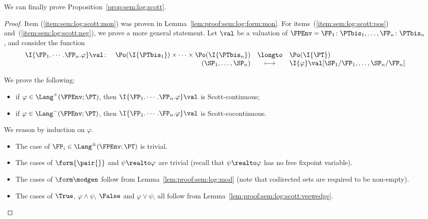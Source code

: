 We can finally prove Proposition~\ref{prop:sem:log:scott}.

\PropFormScott*

\begin{proof}
Item (\ref{item:sem:log:scott:mon})
was proven in Lemma~\ref{lem:proof:sem:log:form:mon}.
For items~(\ref{item:sem:log:scott:pos}) and~(\ref{item:sem:log:scott:neg}),
we prove a more general statement.
Let $\val$ be a valuation of
$\FPEnv = \FP_1\colon \PTbis_1, \dots, \FP_n\colon \PTbis_n$,
and consider the function
\[
\begin{array}{l r c l}
  \I{\FP_1.\cdots.\FP_n.\varphi}\val \colon
& \Po(\I{\PTbis_1}) \times \dots \times \Po(\I{\PTbis_n})
& \longto
& \Po(\I{\PT})
\\
%
& (\SP_1,\dots,\SP_n)
& \longmapsto
& \I{\varphi}\val[\SP_1 / \FP_1, \dots, \SP_n / \FP_n]
\end{array}
\]

\noindent
We prove the following:
\begin{itemize}
\item
if $\varphi \in \Lang^+(\FPEnv;\PT)$,
then 
$\I{\FP_1.\cdots.\FP_n.\varphi}\val$
is Scott-continuous;

\item
if $\varphi \in \Lang^-(\FPEnv;\PT)$,
then 
$\I{\FP_1.\cdots.\FP_n.\varphi}\val$
is Scott-cocontinuous.
\end{itemize}

\noindent
We reason by induction on $\varphi$.
\begin{itemize}
\item
The case of $\FP_i \in \Lang^\pm(\FPEnv;\PT)$ is trivial.

\item
The cases of $\form{\pair{}}$
and $\psi \realto \varphi$ are trivial
(recall that $\psi \realto \varphi$ has no free fixpoint variable).

\item
The cases of $\form\modgen$ follow from Lemma~\ref{lem:proof:sem:log:mod}
(note that codirected sets are required to be non-empty).

\item
The cases of $\True$, $\varphi \land \psi$, $\False$ and $\varphi \lor \psi$,
all follow from Lemma~\ref{lem:proof:sem:log:scott:veewedge}.


\end{itemize}
\end{proof}

